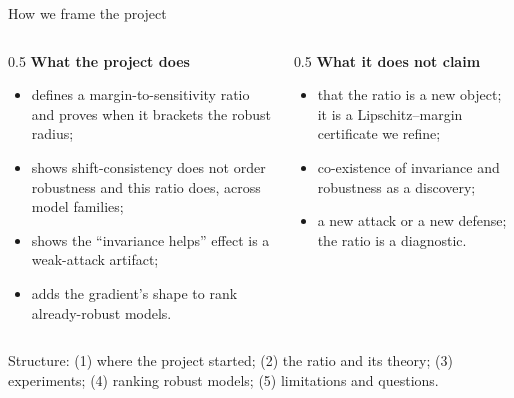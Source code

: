 \documentclass[aspectratio=169,10pt]{beamer}
\begin{document}
\begin{frame}{How we frame the project}{}
  \vspace{0.4em}
  \begin{columns}[T]
    \begin{column}{0.5\textwidth}
      {\footnotesize\textbf{What the project does}}
      \begin{itemize}\footnotesize\itemsep3pt
        \item defines a margin-to-sensitivity ratio and proves when it brackets the robust radius;
        \item shows shift-consistency does not order robustness and this ratio does, across model families;
        \item shows the ``invariance helps'' effect is a weak-attack artifact;
        \item adds the gradient's shape to rank already-robust models.
      \end{itemize}
    \end{column}
    \begin{column}{0.5\textwidth}
      {\footnotesize\textbf{What it does not claim}}
      \begin{itemize}\footnotesize\itemsep3pt
        \item that the ratio is a new object; it is a Lipschitz--margin certificate we refine;
        \item co-existence of invariance and robustness as a discovery;
        \item a new attack or a new defense; the ratio is a diagnostic.
      \end{itemize}
    \end{column}
  \end{columns}
  \vspace{0.4em}
  {\footnotesize\color{slate} Structure: (1) where the project started; (2) the ratio and its theory;
  (3) experiments; (4) ranking robust models; (5) limitations and questions.}
\end{frame}
\end{document}
